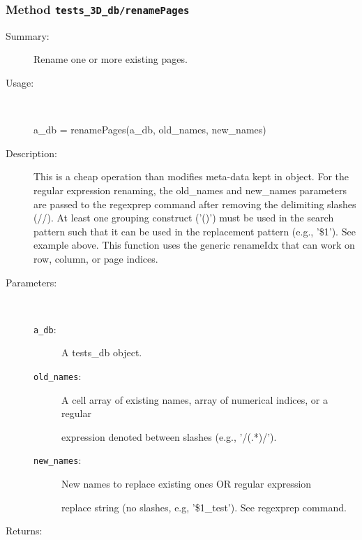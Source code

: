 \subsubsection[Method \texttt{renamePages}]{Method \texttt{tests\_3D\_db/renamePages}}%
%
\label{ref_tests_3D_db__renamePages}%
\hypertarget{ref_tests_3D_db__renamePages}{}%
\begin{description}
\item[Summary:]Rename one or more existing pages.
%
\item[Usage:]~%
\begin{lyxcode}%
a\_db = renamePages(a\_db, old\_names, new\_names)
%
\end{lyxcode}%
%
\item[Description:]%
This is a cheap operation than modifies meta-data kept in object. For
 the regular expression renaming, the old\_names and new\_names
 parameters are passed to the regexprep command after removing the
 delimiting slashes (//). At least one grouping construct ('()') must be
 used in the search pattern such that it can be used in the replacement
 pattern (e.g., '\$1'). See example above. This function uses the generic
 renameIdx that can work on row, column, or page indices.
\item[Parameters:]~
\begin{description}%
\item[\texttt{a\_db}:]
 A tests\_db object.
\item[\texttt{old\_names}:]
 A cell array of existing names, array of numerical indices, or a regular

expression denoted between slashes (e.g., '/(.*)/').
\item[\texttt{new\_names}:]
 New names to replace existing ones OR regular expression

replace string (no slashes, e.g, '\$1\_test'). See regexprep command.
\end{description}%
%
\item[Returns:
]~


\end{description}

